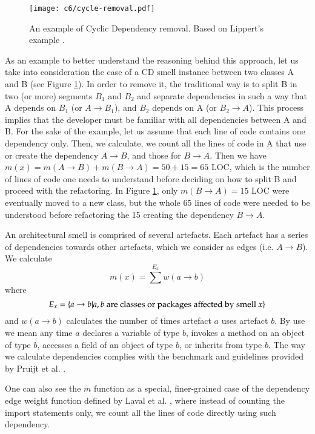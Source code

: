 \begin{figure}[]
    \centering
    \texttt{[image: c6/cycle-removal.pdf]}
    \caption{An example of Cyclic Dependency removal. Based on Lippert's example \cite[p. 128]{Lippert2006}.}
    \label{c6:fig:cd-removal}
\end{figure}

As an example to better understand the reasoning behind this approach, let us take into consideration the case of a CD smell instance between two classes A and B (see Figure \ref{c6:fig:cd-removal}). In order to remove it, the traditional way \cite[p. 128]{Lippert2006} is to split B in two (or more) segments $B_1$ and $B_2$ and separate dependencies in such a way that A depends on $B_1$ (or $A \rightarrow B_1$), and $B_2$ depends on A (or $B_2 \rightarrow A$).
This process implies that the developer must be familiar with all dependencies between A and B. For the sake of the example, let us assume that each line of code contains one dependency only. Then, we calculate, we count all the lines of code in A that use or create the dependency $A \rightarrow B$, and those for $B \rightarrow A$. Then we have $m(x) = m(A \rightarrow B) + m(B \rightarrow A) = 50 + 15 = 65$ LOC, which is the number of lines of code one needs to understand before deciding on how to split B and proceed with the refactoring. In Figure \ref{c6:fig:cd-removal}, only $m(B \rightarrow A) = 15$ LOC were eventually moved to a new class, but the whole 65 lines of code were needed to be understood before refactoring the 15 creating the dependency $B \rightarrow A$.

An architectural smell is comprised of several artefacts. Each artefact has a series of dependencies towards other artefacts, which we consider as edges (i.e. $A \rightarrow B$). We calculate 
\begin{equation}\label{c6:eq:smell-extent-dependency}
    m(x) = \sum^{E_x} w(a \rightarrow b)
\end{equation}
where $$E_x = \{a \rightarrow b | a,b\textnormal{ are classes or packages affected by smell } x\}$$ and $w(a\rightarrow b)$ calculates the number of times artefact $a$ uses artefact $b$. 
By use we mean any time $a$ declares a variable of type $b$, invokes a method on an object of type $b$, accesses a field of an object of type $b$, or inherits from type $b$.
The way we calculate dependencies complies with the benchmark and guidelines provided by Pruijt et al. \cite{Pruijt2017}.

One can also see the $m$ function as a special, finer-grained case of the dependency edge weight function defined by Laval et al. \cite{Laval2012}, where instead of counting the import statements only, we count all the lines of code directly using such dependency.

